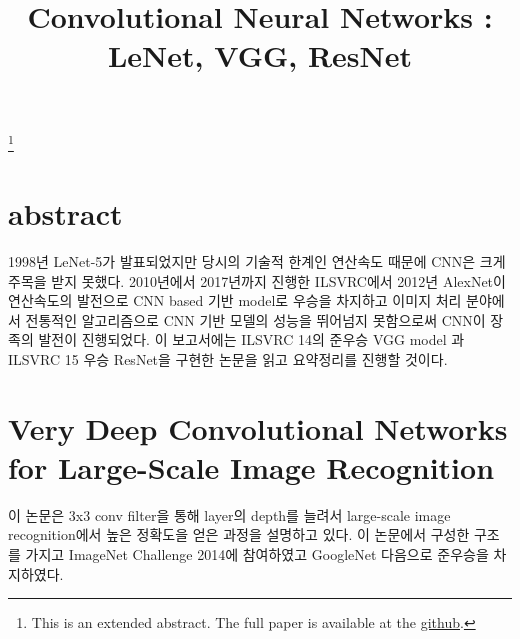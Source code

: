 \documentclass[extendedabs]{bmvc2k}
\begin{document}
\title{Convolutional Neural Networks : LeNet, VGG, ResNet}
\maketitle
\let\thefootnote\relax\footnote{This is an extended abstract. The full paper is available at the \href{https://github.com/LeeGwanHui/TIL/tree/main/deeplearning_ham}{github}. }
\vspace{-0.2in}

\section{abstract}

 1998년 LeNet-5\cite{lecun1998gradient}가 발표되었지만 당시의 기술적 한계인 연산속도 때문에 CNN은 크게 주목을 받지 못했다.
 2010년에서 2017년까지 진행한 ILSVRC에서 2012년 AlexNet\cite{krizhevsky2012imagenet}이 연산속도의 발전으로 CNN based 기반 model로 우승을 차지하고
 이미지 처리 분야에서 전통적인 알고리즘으로 CNN 기반 모델의 성능을 뛰어넘지 못함으로써 CNN이 장족의 발전이 진행되었다.
 이 보고서에는 ILSVRC 14의 준우승 VGG model\cite{simonyan2014very} 과 ILSVRC 15 우승 ResNet\cite{he2016deep}을 구현한 논문을 읽고 요약정리를 진행할 것이다.

 \section{Very Deep Convolutional Networks for Large-Scale Image Recognition}
 이 논문은 3x3 conv filter을 통해 layer의 depth를 늘려서 large-scale image recognition에서 높은 정확도을 얻은 과정을 설명하고 있다.
 이 논문에서 구성한 구조를 가지고 ImageNet Challenge 2014에 참여하였고 GoogleNet 다음으로 준우승을 차지하였다.
\end{document}
